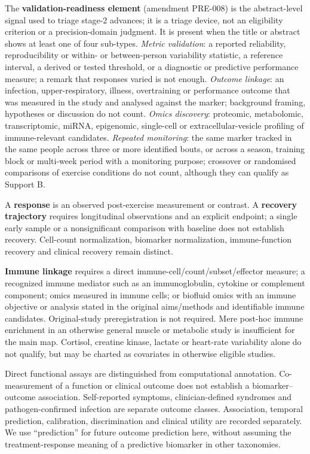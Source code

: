 \documentclass[
  11pt,
  a4paper,
]{article}
\begin{document}
The \textbf{validation-readiness element} (amendment PRE-008) is the
abstract-level signal used to triage stage-2 advances; it is a triage
device, not an eligibility criterion or a precision-domain judgment. It
is present when the title or abstract shows at least one of four
sub-types. \emph{Metric validation}: a reported reliability,
reproducibility or within- or between-person variability statistic, a
reference interval, a derived or tested threshold, or a diagnostic or
predictive performance measure; a remark that responses varied is not
enough. \emph{Outcome linkage}: an infection, upper-respiratory,
illness, overtraining or performance outcome that was measured in the
study and analysed against the marker; background framing, hypotheses or
discussion do not count. \emph{Omics discovery}: proteomic, metabolomic,
transcriptomic, miRNA, epigenomic, single-cell or extracellular-vesicle
profiling of immune-relevant candidates. \emph{Repeated monitoring}: the
same marker tracked in the same people across three or more identified
bouts, or across a season, training block or multi-week period with a
monitoring purpose; crossover or randomised comparisons of exercise
conditions do not count, although they can qualify as Support B.

A \textbf{response} is an observed post-exercise measurement or
contrast. A \textbf{recovery trajectory} requires longitudinal
observations and an explicit endpoint; a single early sample or a
nonsignificant comparison with baseline does not establish recovery.
Cell-count normalization, biomarker normalization, immune-function
recovery and clinical recovery remain distinct.

\textbf{Immune linkage} requires a direct
immune-cell/count/subset/effector measure; a recognized immune mediator
such as an immunoglobulin, cytokine or complement component; omics
measured in immune cells; or biofluid omics with an immune objective or
analysis stated in the original aims/methods and identifiable immune
candidates. Original-study preregistration is not required. Mere
post-hoc immune enrichment in an otherwise general muscle or metabolic
study is insufficient for the main map. Cortisol, creatine kinase,
lactate or heart-rate variability alone do not qualify, but may be
charted as covariates in otherwise eligible studies.

Direct functional assays are distinguished from computational
annotation. Co-measurement of a function or clinical outcome does not
establish a biomarker--outcome association. Self-reported symptoms,
clinician-defined syndromes and pathogen-confirmed infection are
separate outcome classes. Association, temporal prediction, calibration,
discrimination and clinical utility are recorded separately. We use
``prediction'' for future outcome prediction here, without assuming the
treatment-response meaning of a predictive biomarker in other
taxonomies.
\end{document}
